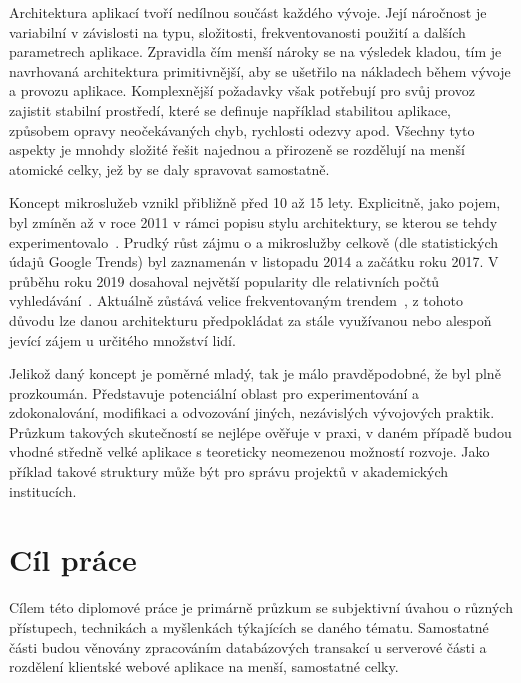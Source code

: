 
Architektura aplikací tvoří nedílnou součást každého vývoje.
Její náročnost je variabilní v závislosti na typu, složitosti, frekventovanosti použití a dalších parametrech aplikace.
Zpravidla čím menší nároky se na výsledek kladou, tím je navrhovaná architektura primitivnější, aby se ušetřilo na nákladech během vývoje a provozu aplikace.
Komplexnější požadavky však potřebují pro svůj provoz zajistit stabilní prostředí, které se definuje například stabilitou aplikace, způsobem opravy neočekávaných chyb, rychlosti odezvy apod.
Všechny tyto aspekty je mnohdy složité řešit najednou a přirozeně se rozdělují na menší atomické celky, jež by se daly spravovat samostatně.

Koncept mikroslužeb vznikl přibližně před 10 až 15 lety.
Explicitně, jako pojem, byl zmíněn až v roce 2011 v rámci popisu stylu architektury, se kterou se tehdy experimentovalo~\cite{msabegin}.
Prudký růst zájmu o  a mikroslužby celkově (dle statistických údajů Google Trends) byl zaznamenán v listopadu 2014 a začátku roku 2017.
V průběhu roku 2019 dosahoval největší popularity dle relativních počtů vyhledávání~\cite{googletrendsmsa}.
Aktuálně  zůstává velice frekventovaným trendem~\cite{googletrendsmsa}, z tohoto důvodu lze danou architekturu předpokládat za stále využívanou nebo alespoň jevící zájem u určitého množství lidí.

Jelikož daný koncept je poměrné mladý, tak je málo pravděpodobné, že byl plně prozkoumán.
Představuje potenciální oblast pro experimentování a zdokonalování, modifikaci a odvozování jiných, nezávislých vývojových praktik.
Průzkum takových skutečností se nejlépe ověřuje v praxi, v daném případě budou vhodné středně velké aplikace s teoreticky neomezenou možností rozvoje.
Jako příklad takové struktury může být  pro správu projektů v akademických institucích.

\clearpage



\section{Cíl práce}\label{sec:cil-prace}
Cílem této diplomové práce je primárně průzkum  se subjektivní úvahou o různých přístupech, technikách a myšlenkách týkajících se daného tématu.
Samostatné části budou věnovány zpracováním databázových transakcí u serverové části a rozdělení klientské webové aplikace na menší, samostatné celky.

